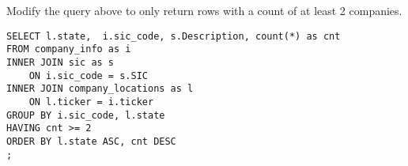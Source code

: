 \documentclass[10pt]{exam}
\begin{document}
\begin{questions}
\question Modify the query above to only return rows with a count
of at least 2 companies.

\begin{solution}
\begin{lstlisting}
SELECT l.state,  i.sic_code, s.Description, count(*) as cnt
FROM company_info as i
INNER JOIN sic as s
    ON i.sic_code = s.SIC
INNER JOIN company_locations as l
    ON l.ticker = i.ticker
GROUP BY i.sic_code, l.state
HAVING cnt >= 2
ORDER BY l.state ASC, cnt DESC
;
\end{lstlisting}
\end{solution}


\end{questions}
\end{document}
